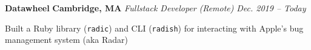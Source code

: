 \item
\headerrow
{\textbf{Datawheel}}
{\textbf{Cambridge, MA}}
\headerrow
{\emph{Fullstack Developer}\textit{ (Remote)}}
{\emph{Dec. 2019 -- Today}}
\begin{itemize*}
    \item Built a Ruby library (\texttt{radic}) and CLI (\texttt{radish}) for
    interacting with Apple's bug management system (aka Radar)
\end{itemize*}